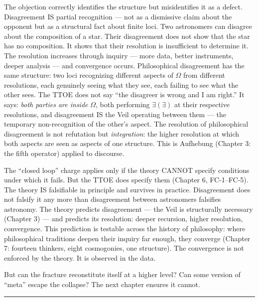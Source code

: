\documentclass[10pt, openany, oneside]{book}
\begin{document}
The objection correctly identifies the structure but misidentifies it as a defect. Disagreement IS partial recognition --- not as a dismissive claim about the opponent but as a structural fact about finite loci. Two astronomers can disagree about the composition of a star. Their disagreement does not show that the star has no composition. It shows that their resolution is insufficient to determine it. The resolution increases through inquiry --- more data, better instruments, deeper analysis --- and convergence occurs. Philosophical disagreement has the same structure: two loci recognizing different aspects of $\Omega$ from different resolutions, each genuinely seeing what they see, each failing to see what the other sees. The TTOE does not say ``the disagreer is wrong and I am right.'' It says: \textit{both parties are inside} $\Omega$, both performing $\exists(\exists)$ at their respective resolutions, and disagreement IS the Veil operating between them --- the temporary non-recognition of the other's aspect. The resolution of philosophical disagreement is not refutation but \textit{integration}: the higher resolution at which both aspects are seen as aspects of one structure. This is Aufhebung (Chapter 3: the fifth operator) applied to discourse.

The ``closed loop'' charge applies only if the theory CANNOT specify conditions under which it fails. But the TTOE does specify them (Chapter 6, FC-1--FC-5). The theory IS falsifiable in principle and survives in practice. Disagreement does not falsify it any more than disagreement between astronomers falsifies astronomy. The theory predicts disagreement --- the Veil is structurally necessary (Chapter 3) --- and predicts its resolution: deeper recursion, higher resolution, convergence. This prediction is testable across the history of philosophy: where philosophical traditions deepen their inquiry far enough, they converge (Chapter 7: fourteen thinkers, eight cosmogonies, one structure). The convergence is not enforced by the theory. It is observed in the data.

But can the fracture reconstitute itself at a higher level? Can some version of ``meta'' escape the collapse? The next chapter ensures it cannot.

\vspace{2em}

\begin{center}
    \rule{0.15\textwidth}{0.3pt}
\end{center}

\vspace{0.5em}
\end{document}
